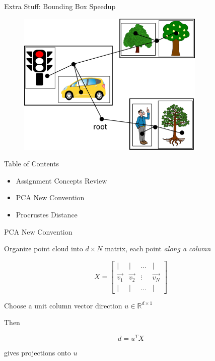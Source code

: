 \documentclass{beamer}
\begin{document}
\begin{frame}{Extra Stuff: Bounding Box Speedup}

\begin{figure}[t]
\centering
\includegraphics[width=0.8\textwidth]{SceneGraphBBox.pdf}
\end{figure}


\end{frame}


\begin{frame}{Table of Contents}
\begin{itemize}[label=$\vartriangleright$]
	\item Assignment Concepts Review
\end{itemize}
\begin{itemize}[label=$\blacktriangleright$]
	\item PCA New Convention
\end{itemize}
\begin{itemize}[label=$\vartriangleright$]
	\item Procrustes Distance
\end{itemize}

\end{frame}

\begin{frame}{PCA New Convention}

Organize point cloud into $d \times N$ matrix, each point {\em along a column}

\[ X = \left[ \begin{array}{cccc} | & | & \hdots & | \\ \vec{v_1} & \vec{v_2} & \vdots & \vec{v_N} \\ | & | & \hdots & | \end{array} \right] \]

Choose a unit column vector direction $u \in \mathbb{R}^{d \times 1}$

Then 

\[ d = u^TX \]

gives projections onto $u$


\end{frame}
\end{document}
